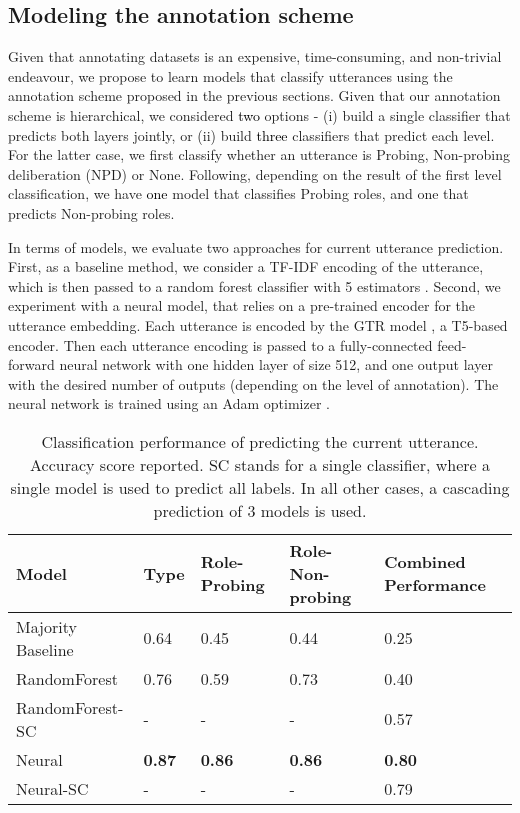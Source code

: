 \documentclass[acmsmall,manuscript,screen]{acmart}
\newcommand\newtext[1]{\textcolor{black}{#1}}
\begin{document}
\subsection{Modeling the annotation scheme}
\label{sec:delidata_prediction}

Given that annotating datasets is an expensive, time-consuming, and non-trivial endeavour, we propose to learn models that classify utterances using the annotation scheme proposed in the previous sections. 
Given that our annotation scheme is hierarchical, we considered \newtext{two} options - (i) build a single classifier that predicts both layers jointly, or (ii) build \newtext{three} classifiers that predict each level. For the latter case, we first classify whether an utterance is Probing, Non-probing deliberation (NPD) or None. Following, depending on the result of the first level classification, we have \newtext{one} model that classifies Probing roles, and one that predicts Non-probing roles. 



In terms of models, we evaluate two approaches for current utterance prediction. First, as a baseline method, we consider a TF-IDF encoding of the utterance, which is then passed to a random forest classifier with 5 estimators \cite{scikit-learn}.
Second, we experiment with a neural model, that relies on a pre-trained encoder for the utterance embedding. Each utterance is encoded by the GTR model \cite{ni2021large}, a T5-based encoder. Then each utterance encoding is passed to a fully-connected feed-forward neural network with one hidden layer of size 512, and one output layer with the desired number of outputs (depending on the level of annotation). The neural network is trained using an Adam optimizer \cite{kingma2015adam}.

\begin{table*}[h!]
\begin{tabular}{|l|l|l|l|l|}
\hline
\textbf{Model} & \textbf{Type} & \textbf{Role-Probing} & \textbf{Role-Non-probing} & \textbf{Combined Performance} \\ \hline
Majority Baseline & 0.64 & 0.45 & 0.44 & 0.25 \\ \hline
RandomForest & 0.76 & 0.59 & 0.73 & 0.40 \\ \hline
RandomForest-SC & - & - & - & 0.57 \\ \hline  
Neural & \textbf{0.87} & \textbf{0.86} &
\textbf{0.86} & \textbf{0.80} \\ \hline
Neural-SC & - & - & - & 0.79 \\ \hline  

\end{tabular}
    \caption{Classification performance of predicting the current utterance. Accuracy score reported. SC stands for a single classifier, where a single model is used to predict all labels. In all other cases, a cascading prediction of 3 models is used.}
    \label{tab:current_utterance_prediction}
\end{table*}
\end{document}
